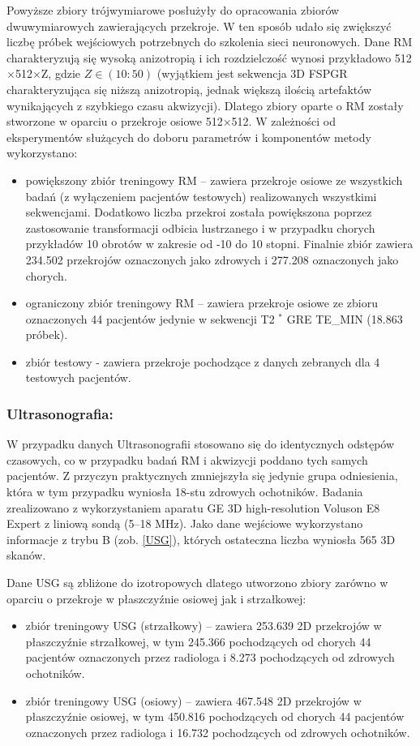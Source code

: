 Powyższe zbiory trójwymiarowe posłużyły do opracowania zbiorów dwuwymiarowych zawierających przekroje. W ten sposób udało się zwiększyć liczbę próbek wejściowych potrzebnych do szkolenia sieci neuronowych. Dane RM charakteryzują się wysoką anizotropią i ich rozdzielczość wynosi przykładowo 512$\times$512$\times$Z, gdzie $Z\in(10:50)$ (wyjątkiem jest sekwencja 3D FSPGR charakteryzująca się niższą anizotropią, jednak większą ilością artefaktów wynikających z szybkiego czasu akwizycji). Dlatego zbiory oparte o RM zostały stworzone w oparciu o przekroje osiowe 512$\times$512. W zależności od eksperymentów służących do doboru parametrów i komponentów metody wykorzystano:
\begin{itemize}
	\item powiększony zbiór treningowy RM -- zawiera przekroje osiowe ze wszystkich badań (z wyłączeniem pacjentów testowych) realizowanych wszystkimi sekwencjami. Dodatkowo liczba przekroi została powiększona poprzez zastosowanie transformacji odbicia lustrzanego i w przypadku chorych przykładów 10 obrotów w zakresie od -10 do 10 stopni. Finalnie zbiór zawiera 234.502 przekrojów oznaczonych jako zdrowych i 277.208 oznaczonych jako chorych.
	\item ograniczony zbiór treningowy RM -- zawiera przekroje osiowe ze zbioru oznaczonych 44 pacjentów jedynie w sekwencji T2 $^\ast$ GRE TE\_MIN (18.863 próbek).
	\item zbiór testowy - zawiera przekroje pochodzące z danych zebranych dla 4 testowych pacjentów.
\end{itemize}

\subsubsection{Ultrasonografia:}
W przypadku danych Ultrasonografii stosowano się do identycznych odstępów czasowych, co w przypadku badań RM i akwizycji poddano tych samych pacjentów. Z przyczyn praktycznych zmniejszyła się jedynie grupa odniesienia, która w tym przypadku wyniosła 18-stu zdrowych ochotników. Badania zrealizowano z wykorzystaniem aparatu GE 3D high-resolution Voluson E8 Expert z liniową sondą (5--18 MHz). Jako dane wejściowe wykorzystano informacje z trybu B (zob. \ref{USG}), których ostateczna liczba wyniosła 565 3D skanów. 

Dane USG są zbliżone do izotropowych dlatego utworzono zbiory zarówno w oparciu o przekroje w płaszczyźnie osiowej jak i strzałkowej:
 \begin{itemize}
 	\item zbiór treningowy USG (strzałkowy) -- zawiera 253.639 2D przekrojów w płaszczyźnie strzałkowej, w tym 245.366 pochodzących od chorych 44 pacjentów oznaczonych przez radiologa i 8.273 pochodzących od zdrowych ochotników.
 	\item zbiór treningowy USG (osiowy) -- zawiera 467.548 2D przekrojów w płaszczyźnie osiowej, w tym 450.816 pochodzących od chorych 44 pacjentów oznaczonych przez radiologa i 16.732 pochodzących od zdrowych ochotników. 
 \end{itemize}

